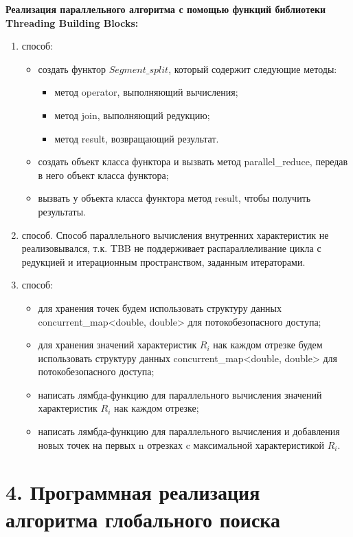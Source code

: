 \documentclass{report}
\begin{document}
\textbf{Реализация параллельного алгоритма с помощью функций библиотеки Threading Building Blocks:}
\begin{enumerate}
  \item способ:
    \begin{itemize}
      \item создать функтор $Segment\_split$, который содержит следующие методы:
        \begin{itemize}
          \item метод operator, выполняющий вычисления;
          \item метод join, выполняющий редукцию;
          \item метод result, возвращающий результат.
        \end{itemize}
      \item создать объект класса функтора и вызвать метод parallel\_reduce, передав в него объект класса функтора;
      \item вызвать у объекта класса функтора метод result, чтобы получить результаты.
    \end{itemize}
  \item способ. Способ параллельного вычисления внутренних характеристик не реализовывался, т.к. TBB не поддерживает распараллеливание цикла с редукцией и итерационным пространством, заданным итераторами.
  \item способ:
    \begin{itemize}
      \item для хранения точек будем использовать структуру данных concurrent\_map<double, double> для потокобезопасного доступа;
      \item для хранения значений характеристик $R_i$ нак каждом отрезке будем использовать структуру данных concurrent\_map<double, double> для потокобезопасного доступа;
      \item написать лямбда-функцию для параллельного вычисления значений характеристик $R_i$ нак каждом отрезке;
      \item написать лямбда-функцию для параллельного вычисления и добавления новых точек на первых n отрезках c максимальной характеристикой $R_i$.
    \end{itemize}
\end{enumerate}

\newpage

\section*{4. Программная реализация алгоритма глобального поиска}
\end{document}

